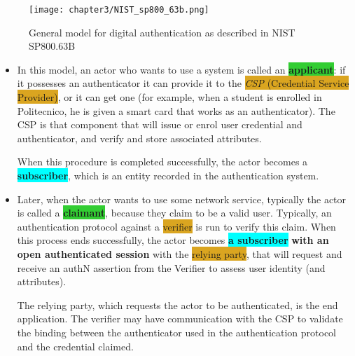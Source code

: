 \begin{figure}[h]
  \centering
  \texttt{[image: chapter3/NIST\_sp800\_63b.png]}
  \caption{General model for digital authentication as described in
    NIST SP800.63B}
\end{figure}

\begin{itemize}
  \item In this model, an actor who wants to use a system
        is called an \colorbox{LimeGreen}{\textbf{applicant}}: if it possesses an
        authenticator it can provide it to the \colorbox{Goldenrod}{\textit{CSP} (Credential Service Provider)}, or it can get one (for example, when a student is enrolled in Politecnico,
        he is given a smart card that works as an
        authenticator). The CSP is that component that will
        issue or enrol user credential and authenticator, and verify and store associated attributes.


        When this procedure is completed successfully, the actor becomes a \colorbox{Cyan}{\textbf{subscriber}}, which is an entity recorded in the authentication system.


  \item Later, when the actor wants to use some network service, typically the actor is called a \colorbox{LimeGreen}{\textbf{claimant}}, because they claim to be a valid user. Typically, an authentication protocol against a \colorbox{Goldenrod}{verifier} is run to verify this claim. When this process ends successfully, the actor becomes
        \colorbox{Cyan}{\textbf{a subscriber}} \textbf{with an open authenticated session} with the \colorbox{Goldenrod}{relying party}, that will request and receive an authN assertion from the Verifier to assess user identity (and attributes).

        The relying party, which requests the actor to be authenticated, is the end application. The verifier may have communication with the CSP to validate the binding between the authenticator used in the authentication protocol and the credential claimed.
\end{itemize}

